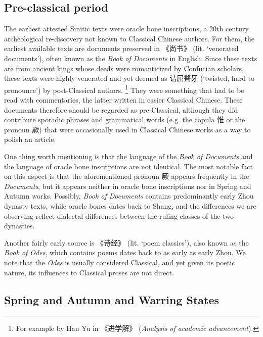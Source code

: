 \documentclass[UTF8, a4paper, oneside, scheme=plain, 12pt]{ctexrep}
\newcommand{\work}[1]{\textit{#1}}
\newcommand{\translate}[1]{`#1'}
\begin{document}
\subsection{Pre-classical period}

The earliest attested Sinitic texts were oracle bone inscriptions,
a 20th century archeological re-discovery not known to Classical Chinese authors.
For them, the earliest available texts are 
documents preserved in 《尚书》 (lit. \translate{venerated documents}),
often known as the \work{Book of Documents} in English.
Since these texts are from ancient kings 
whose deeds were romanticized by Confucian scholars,
these texts were highly venerated and yet deemed as
诘屈聱牙 (\translate{twisted, hard to pronounce})
by post-Classical authors.%
\footnote{
    For example by Han Yu in 《进学解》 (\work{Analysis of academic advancement}).
}
They were something that had to be read with commentaries,
the latter written in easier Classical Chinese.
These documents therefore should be regarded as pre-Classical,
although they did contribute sporadic phrases
and grammatical words (e.g. the copula 惟 or the pronoun 厥)
that were occasionally used in Classical Chinese works as a way to polish an article.

One thing worth mentioning is that 
the language of the \work{Book of Documents} and the language of oracle bone inscriptions are not identical.
The most notable fact on this aspect is that
the aforementioned pronoun 厥 appears frequently in the \work{Documents},
but it appears neither in oracle bone inscriptions nor in Spring and Autumn works. 
Possibly, \work{Book of Documents} contains predominantly early Zhou dynasty texts,
while oracle bones dates back to Shang,
and the differences we are observing reflect dialectal differences between the ruling classes of the two dynasties.

Another fairly early source is 《诗经》 (lit. \translate{poem classics}),
also known as the \work{Book of Odes},
which contains poems dates back to as early as early Zhou.
We note that the \work{Odes} is usually considered Classical,
and yet given its poetic nature, its influences to Classical proses are not direct.

\subsection{Spring and Autumn and Warring States}
\end{document}
